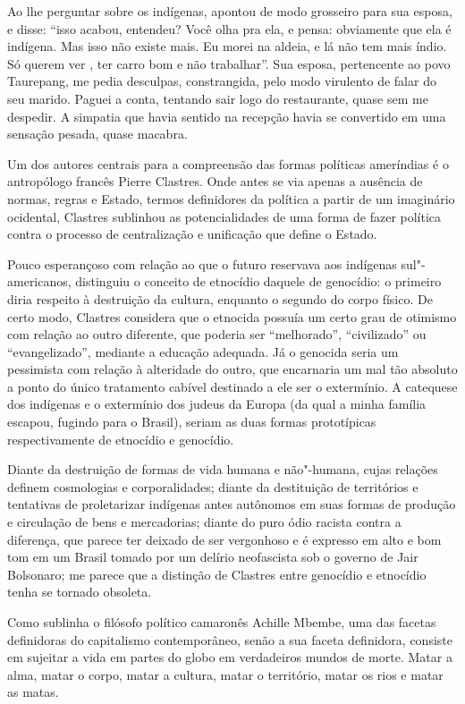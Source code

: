 Ao lhe perguntar sobre os indígenas, apontou de modo grosseiro para sua
esposa, e disse: ``isso acabou, entendeu? Você olha pra ela, e pensa:
obviamente que ela é indígena. Mas isso não existe mais. Eu morei na
aldeia, e lá não tem mais índio. Só querem ver , ter carro bom e não
trabalhar''. Sua esposa, pertencente ao povo Taurepang, me pedia
desculpas, constrangida, pelo modo virulento de falar do seu marido.
Paguei a conta, tentando sair logo do restaurante, quase sem me
despedir. A simpatia que havia sentido na recepção havia se convertido
em uma sensação pesada, quase macabra.

\asterisc

Um dos autores centrais para a compreensão das formas políticas
ameríndias é o antropólogo francês Pierre Clastres.
Onde antes se via apenas a ausência de normas, regras
e Estado, termos definidores da política a partir de um imaginário
ocidental, Clastres sublinhou as potencialidades de uma forma de fazer
política contra o processo de centralização e unificação que define o
Estado.

Pouco esperançoso com relação ao que o futuro reservava aos indígenas sul"-americanos, distinguiu o conceito de etnocídio daquele de genocídio: o
primeiro diria respeito à destruição da cultura, enquanto o segundo do
corpo físico. De certo modo, Clastres considera que o etnocida possuía
um certo grau de otimismo com relação ao outro diferente, que poderia
ser ``melhorado'', ``civilizado'' ou ``evangelizado'', mediante a
educação adequada. Já o genocida seria um pessimista com relação à
alteridade do outro, que encarnaria um mal tão absoluto a ponto do único
tratamento cabível destinado a ele ser o extermínio. A catequese dos
indígenas e o extermínio dos judeus da Europa (da qual a minha família
escapou, fugindo para o Brasil), seriam as duas formas prototípicas
respectivamente de etnocídio e genocídio.

Diante da destruição de formas de vida humana e não"-humana, cujas
relações definem cosmologias e corporalidades; diante da destituição de
territórios e tentativas de proletarizar indígenas antes autônomos em
suas formas de produção e circulação de bens e mercadorias; diante do
puro ódio racista contra a diferença, que parece ter deixado de ser
vergonhoso e é expresso em alto e bom tom em um Brasil tomado por um
delírio neofascista sob o governo de Jair Bolsonaro; me parece que a
distinção de Clastres entre genocídio e etnocídio tenha se tornado
obsoleta.

Como sublinha o filósofo político camaronês Achille Mbembe, uma das
facetas definidoras do capitalismo contemporâneo, senão a sua faceta
definidora, consiste em sujeitar a vida em partes do globo em
verdadeiros mundos de morte. Matar a alma, matar o corpo, matar a
cultura, matar o território, matar os rios e matar as matas.

